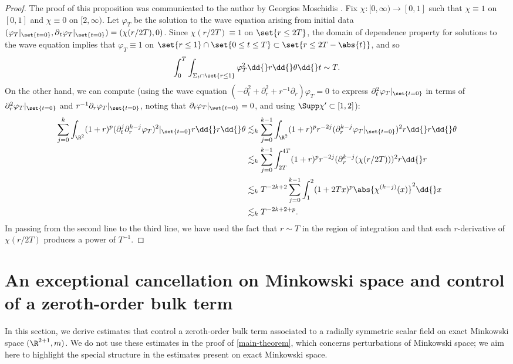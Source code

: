 \documentclass[10pt, reqno]{amsart}
\begin{document}
\begin{proof}
The proof of this proposition was communicated to the author by Georgios
Moschidis \cite{moschidis-personal-communication}. Fix \(\chi{}:[0,\infty)\to
[0,1]\) such that \(\chi{}\equiv 1\) on \([0,1]\) and \(\chi{}\equiv 0\) on
\([2,\infty)\). Let \(\varphi_T\) be the solution to the wave equation arising
from initial data
\((\varphi{}_T|_{\set{t=0}},\partial{}_t\varphi{}_T|_{\set{t=0}}) =
(\chi{}(r/2T),0)\). Since \(\chi{}(r/2T)\equiv 1\) on \(\set{r\le 2T}\), the
domain of dependence property for solutions to the wave equation implies that
\(\varphi_T\equiv 1\) on \(\set{r\le 1}\cap \set{0\le t\le T}\subset \set{r\le 2T-\abs{t}}\), and so
\begin{equation}
\int_0^T \int _{\Sigma{}_t\cap \set{r\le 1}}\varphi{}_T^2\dd{}r\dd{}\theta{}\dd{}t \sim T.
\end{equation}
On the other hand, we can compute (using the wave equation \((-\partial_t^2 + \partial_r^2 +
r^{-1}\partial_r)\varphi_T = 0\) to express
\(\partial_t^2\varphi_T|_{\set{t=0}}\) in terms of
\(\partial_r^2\varphi_T|_{\set{t=0}}\) and
\(r^{-1}\partial_r\varphi_T|_{\set{t=0}}\), noting that
\(\partial_t\varphi_T|_{\set{t=0}} = 0\), and using \(\Supp \chi{}'\subset [1,2]\)):
\begin{equation}
\begin{split}
\sum_{j=0}^k\int _{\R^2}(1+r)^p(\partial_t^j\partial_r^{k-j}\varphi_T)^2|_{\set{t=0}}r\dd{}r\dd{}\theta{}&\lesssim_k \sum_{j=0}^{k-1}\int _{\R^2}(1+r)^pr^{-2j}(\partial_r^{k-j}\varphi_T|_{\set{t=0}})^2r\dd{}r\dd{}\theta{} \\
&\lesssim_k \sum_{j=0}^{k-1}\int_{2T}^{4T} (1+r)^pr^{-2j}(\partial{}_r^{k-j}(\chi{}(r/2T)))^2r\dd{}r\\
&\lesssim_k T^{-2k+2} \sum_{j=0}^{k-1}\int_1^2 (1+2Tx)^p\abs{\chi^{(k-j)}(x)}^2\dd{}x \\
&\lesssim_k T^{-2k+2+p}.
\end{split}
\end{equation}
In passing from the second line to the third line, we have used the fact that
\(r\sim T\) in the region of integration and that each \(r\)-derivative of
\(\chi{}(r/2T)\) produces a power of \(T^{-1}\).
\end{proof}
\section{An exceptional cancellation on Minkowski space and control of a zeroth-order bulk term}
\label{mink-zo} In this section, we derive estimates that control a zeroth-order
bulk term associated to a radially symmetric scalar field on exact Minkowski
space \((\R^{2+1},m)\). We do not use these estimates in the proof of
\cref{main-theorem}, which concerns perturbations of Minkowski space; we aim here
to highlight the special structure in the estimates present on exact Minkowski
space.
\end{document}
